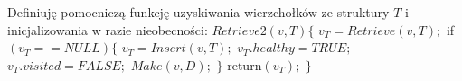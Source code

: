 \documentclass{pracamgr}
\begin{document}
     Definiuję pomocniczą funkcję uzyskiwania wierzchołków ze struktury $T$ i inicjalizowania w razie nieobecności:\newline\newline
     \hspace*{0pt}$Retrieve2(v,T)\{$\newline
     \hspace*{16pt}	$v_T=Retrieve(v,T);$\newline
     \hspace*{16pt}	if$(v_T==NULL)\{$\newline
     \hspace*{32pt}		$v_T=Insert(v,T);$\newline
     \hspace*{32pt}		$v_T.healthy=TRUE;$\newline
     \hspace*{32pt}		$v_T.visited=FALSE;$\newline
     \hspace*{32pt}		$Make(v,D);$\newline
     \hspace*{16pt}	$\}$\newline
     \hspace*{16pt}	return$(v_T);$\newline
     \hspace*{0pt}$\}$\newline
     
\end{document}
